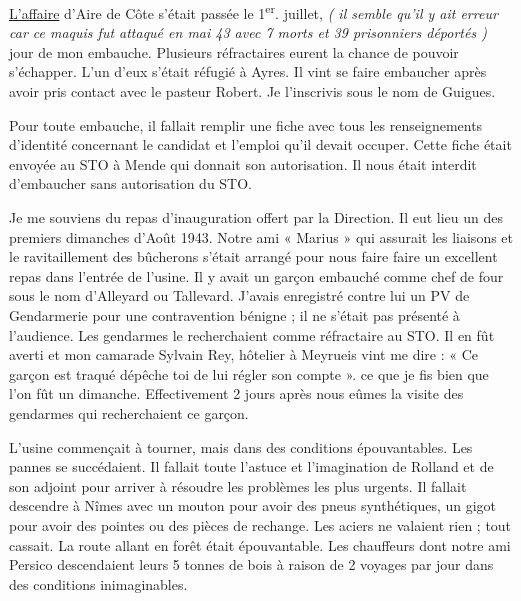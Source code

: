 \vspace{0.35cm}

\underline{L’affaire} d’Aire de Côte s’était passée le 1\textsuperscript{er}. juillet, \textit{( il semble qu’il y ait erreur car ce
maquis fut attaqué en mai 43 avec 7 morts et 39 prisonniers déportés )} jour de mon
embauche. Plusieurs réfractaires eurent la chance de pouvoir s’échapper. L’un d’eux s’était
réfugié à Ayres. Il vint se faire embaucher après avoir pris contact avec le pasteur Robert. Je
l’inscrivis sous le nom de Guigues.

\vspace{0.45cm}

Pour toute embauche, il fallait remplir une fiche avec tous les renseignements d’identité
concernant le candidat et l’emploi qu’il devait occuper. Cette fiche était envoyée au STO à
Mende qui donnait son autorisation. Il nous était interdit d’embaucher sans autorisation du
STO.

\vspace{0.45cm}

Je me souviens du repas d’inauguration offert par la Direction. Il eut lieu un des premiers
dimanches d’Août 1943. Notre ami « Marius » qui assurait les liaisons et le ravitaillement des
bûcherons s’était arrangé pour nous faire faire un excellent repas dans l’entrée de l’usine. Il y
avait un garçon embauché comme chef de four sous le nom d’Alleyard ou Tallevard. J’avais
enregistré contre lui un PV de Gendarmerie pour une contravention bénigne ; il ne s’était pas
présenté à l’audience. Les gendarmes le recherchaient comme réfractaire au STO. Il en fût
averti et mon camarade Sylvain Rey, hôtelier à Meyrueis vint me dire : « Ce garçon est traqué dépêche toi de lui régler son compte ». ce que je fis bien que l’on fût un dimanche.
Effectivement 2 jours après nous eûmes la visite des gendarmes qui recherchaient ce garçon.

\vspace{0.45cm}

L’usine commençait à tourner, mais dans des conditions épouvantables. Les pannes se
succédaient. Il fallait toute l’astuce et l’imagination de Rolland et de son adjoint pour arriver à
résoudre les problèmes les plus urgents. Il fallait descendre à Nîmes avec un mouton pour
avoir des pneus synthétiques, un gigot pour avoir des pointes ou des pièces de rechange. Les
aciers ne valaient rien ; tout cassait. La route allant en forêt était épouvantable. Les chauffeurs
dont notre ami Persico descendaient leurs 5 tonnes de bois à raison de 2 voyages par jour dans
des conditions inimaginables.

